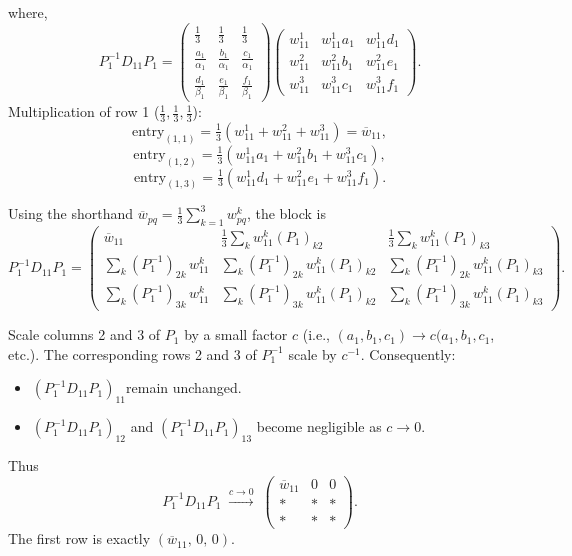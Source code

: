 \documentclass[12pt,a4paper]{article}
\theoremstyle{definition}
\begin{document}
where,
\[
P_1^{-1}D_{11}P_1 = \begin{pmatrix}
\frac{1}{3} & \frac{1}{3} & \frac{1}{3} \\
\frac{a_1}{\alpha_1} & \frac{b_1}{\alpha_1} & \frac{c_1}{\alpha_1} \\
\frac{d_1}{\beta_1} & \frac{e_1}{\beta_1} & \frac{f_1}{\beta_1}
\end{pmatrix}
\begin{pmatrix}
w^1_{11} & w^1_{11}a_1 & w^1_{11}d_1 \\
w^2_{11} & w^2_{11}b_1 & w^2_{11}e_1 \\
w^3_{11} & w^3_{11}c_1 & w^3_{11}f_1
\end{pmatrix}.
\]
Multiplication of row 1 (\(\tfrac{1}{3},\tfrac{1}{3},\tfrac{1}{3}\)):
\[
\text{entry}_{(1,1)} = \tfrac{1}{3}(w^1_{11} + w^2_{11} + w^3_{11}) = \overline{w}_{11},
\]
\[
\text{entry}_{(1,2)} = \tfrac{1}{3}(w^1_{11}a_1 + w^2_{11}b_1 + w^3_{11}c_1),
\]
\[
\text{entry}_{(1,3)} = \tfrac{1}{3}(w^1_{11}d_1 + w^2_{11}e_1 + w^3_{11}f_1).
\]


Using the shorthand \(\overline{w}_{pq} = \tfrac{1}{3}\sum_{k=1}^3 w^k_{pq}\), the block is
\[
P_1^{-1}D_{11}P_1 = \begin{pmatrix}
\overline{w}_{11} & \tfrac{1}{3}\sum_k w^k_{11}(P_1)_{k2} & \tfrac{1}{3}\sum_k w^k_{11}(P_1)_{k3} \\[4pt]
\sum_k (P_1^{-1})_{2k}\,w^k_{11} & \sum_k (P_1^{-1})_{2k}\,w^k_{11}(P_1)_{k2} & \sum_k (P_1^{-1})_{2k}\,w^k_{11}(P_1)_{k3} \\[4pt]
\sum_k (P_1^{-1})_{3k}\,w^k_{11} & \sum_k (P_1^{-1})_{3k}\,w^k_{11}(P_1)_{k2} & \sum_k (P_1^{-1})_{3k}\,w^k_{11}(P_1)_{k3}
\end{pmatrix}.
\]

Scale columns 2 and 3 of \(P_1\) by a small factor \(c\) (i.e., \((a_1, b_1, c_1) \to c (a_1, b_1, c_1\),  etc.). The corresponding rows 2 and 3 of \(P_1^{-1}\) scale by \(c^{-1}\). Consequently: 
\begin{itemize}
\item \(\left(P_1^{-1}D_{11}P_1\right)_{11}\)remain unchanged.
\item \(\left(P_1^{-1}D_{11}P_1\right)_{12}\) and \(\left(P_1^{-1}D_{11}P_1\right)_{13}\) become negligible as \(c\to 0\).
\end{itemize}
Thus
\[
P_1^{-1}D_{11}P_1 \;\xrightarrow{c\to 0}\; \begin{pmatrix}
\overline{w}_{11} & 0 & 0 \\
* & * & * \\
* & * & *
\end{pmatrix}.
\]
The first row is exactly \((\overline{w}_{11},\,0,\,0)\).
\end{document}
